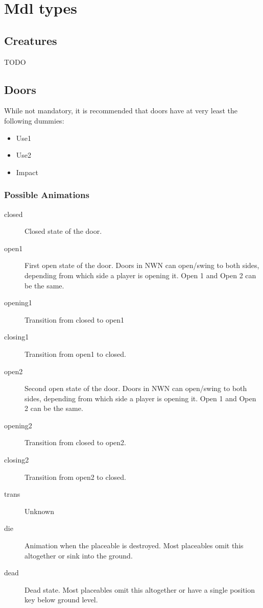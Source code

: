 \chapter{Mdl types}

\section{Creatures}
TODO

\section{Doors}
While not mandatory, it is recommended that doors have at very least the
following dummies:
\begin{itemize}
\item Use1
\item Use2
\item Impact
\end{itemize}

\subsection*{Possible Animations}
\begin{description}
    \item[closed] Closed state of the door.
    \item[open1] First open state of the door. Doors in NWN can open/swing to both sides, depending from which side a player is opening it. Open 1 and Open 2 can be the same.
    \item[opening1] Transition from closed to open1
    \item[closing1] Transition from open1 to closed.
    \item[open2] Second open state of the door. Doors in NWN can open/swing to both sides, depending from which side a player is opening it. Open 1 and Open 2 can be the same.
    \item[opening2] Transition from closed to open2.
    \item[closing2] Transition from open2 to closed.
    \item[trans] Unknown
    \item[die] Animation when the placeable is destroyed. Most placeables omit this altogether or sink into the ground.
    \item[dead] Dead state. Most placeables omit this altogether or have a single position key below ground level.
\end{description}

